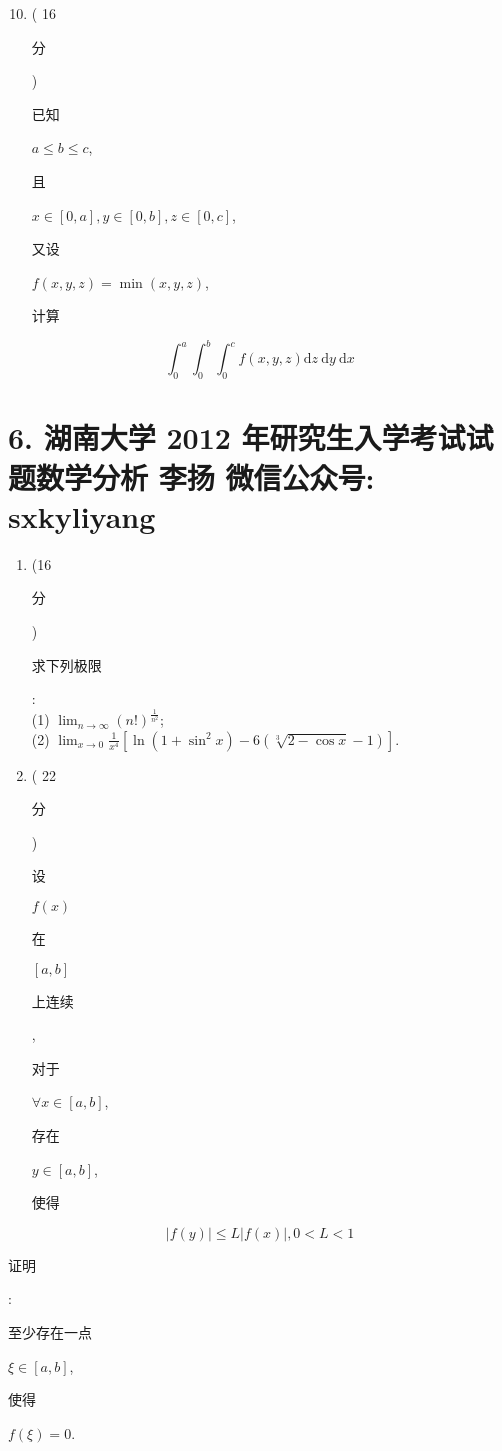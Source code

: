 \documentclass[10pt]{article}
\begin{document}
\begin{enumerate}
  \setcounter{enumi}{9}
  \item ( 16 \begin{CJK}{UTF8}{mj}分\end{CJK}) \begin{CJK}{UTF8}{mj}已知\end{CJK} $a \leqslant b \leqslant c$, \begin{CJK}{UTF8}{mj}且\end{CJK} $x \in[0, a], y \in[0, b], z \in[0, c]$, \begin{CJK}{UTF8}{mj}又设\end{CJK} $f(x, y, z)=\min (x, y, z)$, \begin{CJK}{UTF8}{mj}计算\end{CJK}
\end{enumerate}
$$
\int_{0}^{a} \int_{0}^{b} \int_{0}^{c} f(x, y, z) \mathrm{d} z \mathrm{~d} y \mathrm{~d} x
$$

\section{6. 湖南大学 2012 年研究生入学考试试题数学分析 
 李扬 
 微信公众号: sxkyliyang}
\begin{enumerate}
  \item (16 \begin{CJK}{UTF8}{mj}分\end{CJK}) \begin{CJK}{UTF8}{mj}求下列极限\end{CJK}:\\
(1) $\lim _{n \rightarrow \infty}(n !)^{\frac{1}{n^{2}}}$;\\
(2) $\lim _{x \rightarrow 0} \frac{1}{x^{4}}\left[\ln \left(1+\sin ^{2} x\right)-6(\sqrt[3]{2-\cos x}-1)\right]$.

  \item ( 22 \begin{CJK}{UTF8}{mj}分\end{CJK}) \begin{CJK}{UTF8}{mj}设\end{CJK} $f(x)$ \begin{CJK}{UTF8}{mj}在\end{CJK} $[a, b]$ \begin{CJK}{UTF8}{mj}上连续\end{CJK}, \begin{CJK}{UTF8}{mj}对于\end{CJK} $\forall x \in[a, b]$, \begin{CJK}{UTF8}{mj}存在\end{CJK} $y \in[a, b]$, \begin{CJK}{UTF8}{mj}使得\end{CJK}

\end{enumerate}
$$
|f(y)| \leqslant L|f(x)|, 0<L<1
$$
\begin{CJK}{UTF8}{mj}证明\end{CJK}: \begin{CJK}{UTF8}{mj}至少存在一点\end{CJK} $\xi \in[a, b]$, \begin{CJK}{UTF8}{mj}使得\end{CJK} $f(\xi)=0$.
\end{document}
